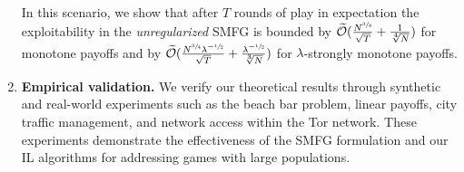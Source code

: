 \begin{enumerate}
    In this scenario, we show that after $T$ rounds of play in expectation the exploitability in the \emph{unregularized} SMFG is bounded by
    $\widetilde{\mathcal{O}}(\frac{N^{\sfrac{3}{4}}}{\sqrt{T}} + \frac{1}{\sqrt[4]{N}})$ for monotone payoffs and by
    $\widetilde{\mathcal{O}}(\frac{N^{\sfrac{3}{4}} \lambda^{-\sfrac{1}{2}}}{\sqrt{T}} + \frac{\lambda^{-\sfrac{1}{2}}}{\sqrt[3]{N}})$ for $\lambda$-strongly monotone payoffs.
    \item \textbf{Empirical validation.} We verify our theoretical results through synthetic and real-world experiments such as the beach bar problem, linear payoffs, city traffic management, and network access within the Tor network.
    These experiments demonstrate the effectiveness of the SMFG formulation and our IL algorithms for addressing games with large populations. 
\end{enumerate}





